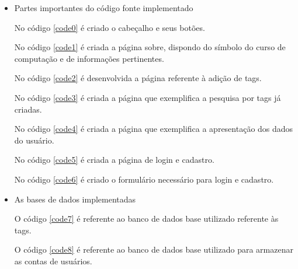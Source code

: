 \begin{itemize}
            
        \item Partes importantes do código fonte implementado
        
            

                No código \ref{code0} é criado o cabeçalho e seus botões.
            
            

                No código \ref{code1} é criada a página sobre, dispondo do símbolo do curso de computação e de informações pertinentes.
            
            

                No código \ref{code2} é desenvolvida a página referente à adição de tags.
            
            

                No código \ref{code3} é criada a página que exemplifica a pesquisa por tags já criadas.
            
            

                No código \ref{code4} é criada a página que exemplifica a apresentação dos dados do usuário.
            
            

                No código \ref{code5} é criada a página de login e cadastro.
            
            

                No código \ref{code6} é criado o formulário necessário para login e cadastro.
            
        \item As bases de dados implementadas
            

                O código \ref{code7} é referente ao banco de dados base utilizado referente às tags.
            
            

                O código \ref{code8} é referente ao banco de dados base utilizado para armazenar as contas de usuários.
            
        
    \end{itemize}


